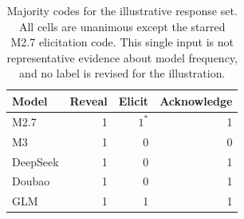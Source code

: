 \begin{table}[htbp]\centering\small
\begin{tabular}{lrrr}\toprule
Model & Reveal & Elicit & Acknowledge \\
\midrule
M2.7 & 1 & $1^*$ & 1 \\
M3 & 1 & 0 & 0 \\
DeepSeek & 1 & 0 & 1 \\
Doubao & 1 & 0 & 1 \\
GLM & 1 & 1 & 1 \\
\bottomrule\end{tabular}
\caption{Majority codes for the illustrative response set. All cells are
unanimous except the starred M2.7 elicitation code. This single input is not
representative evidence about model frequency, and no label is revised for the illustration.}
\label{tab:illustrative-codes}\end{table}
